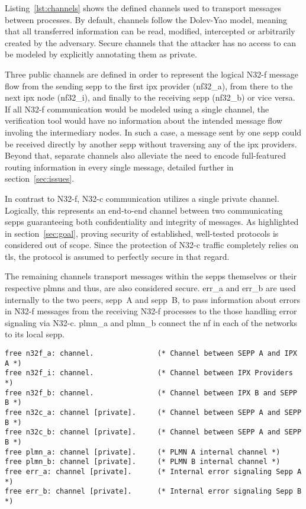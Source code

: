 Listing~\ref{lst:channels} shows the defined channels used to transport messages between processes.
By default, channels follow the Dolev-Yao model, meaning that all transferred information can be read, modified, intercepted or arbitrarily created by the adversary.
Secure channels that the attacker has no access to can be modeled by explicitly annotating them as private.

Three public channels are defined in order to represent the logical N32-f message flow from the sending \gls{sepp} to the first \gls{ipx} provider ({\sffamily nf32\_a}), from there to the next \gls{ipx} node ({\sffamily nf32\_i}), and finally to the receiving \gls{sepp} ({\sffamily nf32\_b}) or vice versa.
If all N32-f communication would be modeled using a single channel, the verification tool would have no information about the intended message flow involing the intermediary nodes.
In such a case, a message sent by one \gls{sepp} could be received directly by another \gls{sepp} without traversing any of the \gls{ipx} providers.
Beyond that, separate channels also alleviate the need to encode full-featured routing information in every single message, detailed further in section~\ref{sec:issues}.

In contrast to N32-f, N32-c communication utilizes a single private channel.
Logically, this represents an end-to-end channel between two communicating \glspl{sepp} guaranteeing both confidentiality and integrity of messages.
As highlighted in section~\ref{sec:goal}, proving security of established, well-tested protocols is considered out of scope.
Since the protection of N32-c traffic completely relies on \gls{tls}, the protocol is assumed to perfectly secure in that regard.

The remaining channels transport messages within the \glspl{sepp} themselves or their respective \glspl{plmn} and thus, are also considered secure.
{\sffamily err\_a} and {\sffamily err\_b} are used internally to the two peers, \gls{sepp}~A and \gls{sepp}~B, to pass information about errors in N32-f messages from the receiving N32-f processes to the those handling error signaling via N32-c.
{\sffamily plmn\_a} and {\sffamily plmn\_b} connect the \gls{nf} in each of the networks to its local \gls{sepp}.

\begin{lstlisting}[caption={Custom channel declarations},label={lst:channels},firstnumber=22]
free n32f_a: channel.               (* Channel between SEPP A and IPX A *)
free n32f_i: channel.               (* Channel between IPX Providers *)
free n32f_b: channel.               (* Channel between IPX B and SEPP B *)
free n32c_a: channel [private].     (* Channel between SEPP A and SEPP B *)
free n32c_b: channel [private].     (* Channel between SEPP A and SEPP B *)
free plmn_a: channel [private].     (* PLMN A internal channel *)
free plmn_b: channel [private].     (* PLMN B internal channel *)
free err_a: channel [private].      (* Internal error signaling Sepp A *)
free err_b: channel [private].      (* Internal error signaling Sepp B *)
\end{lstlisting}

